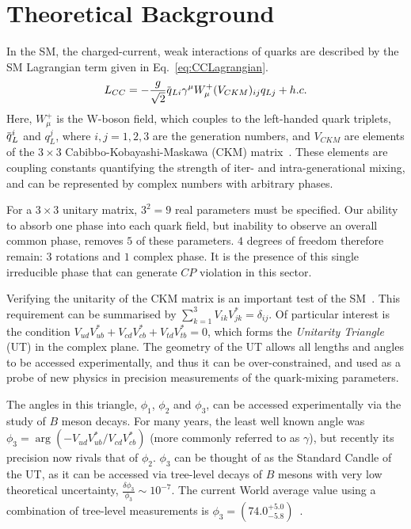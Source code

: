 \documentclass[oneside,12pt]{article}
\newcommand{\overbar}[1]{\mkern 1.5mu\overline{\mkern-1.5mu#1\mkern-1.5mu}\mkern
1.5mu}
\begin{document}
\vspace{-3mm}
\section{\normalsize Theoretical Background} \label{sec:theory}
In the SM, the charged-current, weak interactions of quarks are described by the
SM Lagrangian term given in Eq.~\eqref{eq:CCLagrangian}.
\begin{equation}
  L_{CC}=-\frac{g}{\sqrt{2}}\overbar{q}_{Li}\gamma^{\mu}W_{\mu}^{+}(V_{CKM})_{ij}q_{Lj}
  + h.c.  
  \label{eq:CCLagrangian}
\end{equation}
\noindent Here, $W_{\mu}^{+}$ is the W-boson field, which couples to the
left-handed quark triplets, $\overbar{q}_{L}^{i}$ and $q_{L}^{j}$, where
$i,j=1,2,3$ are the generation numbers, and $V_{CKM}$ are elements of the
$3\times 3$ Cabibbo-Kobayashi-Maskawa (CKM) matrix~\cite{CKMTheory}. These
elements are coupling constants quantifying the strength of iter- and
intra-generational mixing, and can be represented by complex numbers with arbitrary phases.

For a $3\times 3$ unitary matrix, $3^2=9$ real parameters must be specified. Our
ability to absorb one phase into each quark field, but inability to observe an
overall common phase, removes $5$ of these parameters. $4$ degrees of freedom
therefore remain: $3$ rotations and $1$ complex phase. It is the presence of
this single irreducible phase that can generate $CP$ violation in this sector.

Verifying the unitarity of the CKM matrix is an important test of the
SM~\cite{CKMTheory}. This requirement can be summarised by
$\sum_{k=1}^{3}V_{ik}V^*_{jk}=\delta_{ij}$. Of particular interest is the
condition $V_{ud}V^{*}_{ub}+V_{cd}V^{*}_{cb}+V_{td}V^{*}_{tb}=0$, which forms
the \emph{Unitarity Triangle} (UT) in the complex plane. The geometry of the UT
allows all lengths and angles to be accessed experimentally, and thus it can be
over-constrained, and used as a probe of new physics in precision measurements
of the quark-mixing parameters. 

The angles in this triangle, $\phi_1$, $\phi_2$ and $\phi_3$, can be accessed
experimentally via the study of $B$ meson decays. For many years, the least well
known angle was $\phi_3=\arg(-V_{ud}V^{*}_{ub}/V_{cd}V^{*}_{cb})$ (more commonly
referred to as $\gamma$), but recently its precision now rivals that of
$\phi_2$. $\phi_3$ can be thought of as the Standard Candle of the UT, as it can
be accessed via tree-level decays of $B$ mesons with very low theoretical
uncertainty, $\frac{\delta\phi_3}{\phi_3}\sim 10^{-7}$. The current World
average value using a combination of tree-level measurements is
$\phi_3=(74.0^{+5.0}_{-5.8})$\degree~\cite{LatestGamma}.
\end{document}
